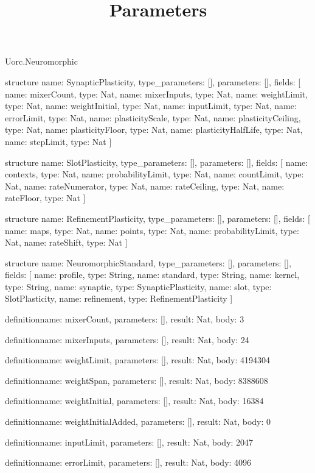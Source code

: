 \begin{lexlean}{Uorc.Neuromorphic}
\title{Parameters}
\begin{semanticmodule}
structure{
  name: SynapticPlasticity,
  type_parameters: [],
  parameters: [],
  fields: [
    {name: mixerCount, type: Nat},
    {name: mixerInputs, type: Nat},
    {name: weightLimit, type: Nat},
    {name: weightInitial, type: Nat},
    {name: inputLimit, type: Nat},
    {name: errorLimit, type: Nat},
    {name: plasticityScale, type: Nat},
    {name: plasticityCeiling, type: Nat},
    {name: plasticityFloor, type: Nat},
    {name: plasticityHalfLife, type: Nat},
    {name: stepLimit, type: Nat}
  ]
}

structure{
  name: SlotPlasticity,
  type_parameters: [],
  parameters: [],
  fields: [
    {name: contexts, type: Nat},
    {name: probabilityLimit, type: Nat},
    {name: countLimit, type: Nat},
    {name: rateNumerator, type: Nat},
    {name: rateCeiling, type: Nat},
    {name: rateFloor, type: Nat}
  ]
}

structure{
  name: RefinementPlasticity,
  type_parameters: [],
  parameters: [],
  fields: [
    {name: maps, type: Nat},
    {name: points, type: Nat},
    {name: probabilityLimit, type: Nat},
    {name: rateShift, type: Nat}
  ]
}

structure{
  name: NeuromorphicStandard,
  type_parameters: [],
  parameters: [],
  fields: [
    {name: profile, type: String},
    {name: standard, type: String},
    {name: kernel, type: String},
    {name: synaptic, type: SynapticPlasticity},
    {name: slot, type: SlotPlasticity},
    {name: refinement, type: RefinementPlasticity}
  ]
}

definition{name: mixerCount, parameters: [], result: Nat, body: 3}

definition{name: mixerInputs, parameters: [], result: Nat, body: 24}

definition{name: weightLimit, parameters: [], result: Nat, body: 4194304}

definition{name: weightSpan, parameters: [], result: Nat, body: 8388608}

definition{name: weightInitial, parameters: [], result: Nat, body: 16384}

definition{name: weightInitialAdded, parameters: [], result: Nat, body: 0}

definition{name: inputLimit, parameters: [], result: Nat, body: 2047}

definition{name: errorLimit, parameters: [], result: Nat, body: 4096}


\end{semanticmodule}
\end{lexlean}
